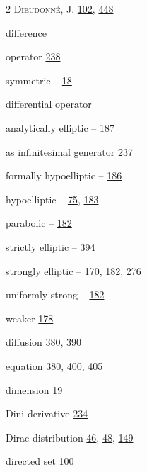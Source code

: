 \begin{multicols}{2}
\noindent \textsc{Dieudonné}, J. \hyperlink{page.102}{102}, \hyperlink{page.448}{448}\par
\noindent difference\par
\hspace*{1.1em}operator \hyperlink{page.238}{238}\par
\hspace*{1.1em}symmetric -- \hyperlink{page.18}{18}\par
\noindent differential operator\par
\hspace*{1.1em}analytically elliptic -- \hyperlink{page.187}{187}\par
\hspace*{1.1em}as infinitesimal generator \hyperlink{page.237}{237}\par
\hspace*{1.1em}formally hypoelliptic -- \hyperlink{page.186}{186}\par
\hspace*{1.1em}hypoelliptic -- \hyperlink{page.75}{75}, \hyperlink{page.183}{183}\par
\hspace*{1.1em}parabolic -- \hyperlink{page.182}{182}\par
\hspace*{1.1em}strictly elliptic -- \hyperlink{page.394}{394}\par
\hspace*{1.1em}strongly elliptic -- \hyperlink{page.170}{170}, \hyperlink{page.182}{182}, \hyperlink{page.276}{276}\par
\hspace*{1.1em}uniformly strong -- \hyperlink{page.182}{182}\par
\hspace*{1.1em}weaker \hyperlink{page.178}{178}\par
\noindent diffusion \hyperlink{page.380}{380}, \hyperlink{page.390}{390}\par
\hspace*{1.1em}equation \hyperlink{page.380}{380}, \hyperlink{page.400}{400}, \hyperlink{page.405}{405}\par
\noindent dimension \hyperlink{page.19}{19}\par
\noindent Dini derivative \hyperlink{page.234}{234}\par
\noindent Dirac distribution \hyperlink{page.46}{46}, \hyperlink{page.48}{48}, \hyperlink{page.149}{149}\par
\noindent directed set \hyperlink{page.100}{100}\par

\end{multicols}
